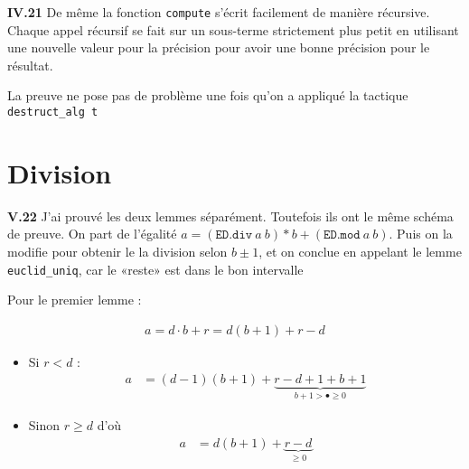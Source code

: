 \documentclass[9pt,a4paper,twocolumn]{article}
\theoremstyle{definition}
\renewcommand{\geq}{\geqslant}
\newenvironment{code}[1][ocaml]{%
\newgeometry{textwidth = 0.8\textwidth}
\VerbatimEnvironment\begin{verbatim}%
}{%
\end{verbatim}
\restoregeometry
}
\begin{document}

\textbf{IV.21}
De même la fonction \texttt{compute} s'écrit facilement de manière récursive.
Chaque appel récursif se fait sur un sous-terme strictement plus petit
en utilisant une nouvelle valeur pour la précision pour avoir une bonne
précision pour le résultat.

La preuve ne pose pas de problème une fois qu'on a appliqué la tactique
\texttt{destruct\_alg t}



\section{Division}

\textbf{V.22}
J'ai prouvé les deux lemmes séparément. Toutefois ils ont le même schéma de
preuve.
On part de l'égalité $a = (\texttt{ED.div}\ a\ b)*b+(\texttt{ED.mod}\ a\ b)$.
Puis on la modifie pour obtenir le la division selon $b\pm 1$, et on conclue en
appelant le lemme \texttt{euclid\_uniq}, car le «reste» est dans le bon
intervalle

Pour le premier lemme :

\begin{align*}
   a = d\cdot b+r = d(b+1) +r-d
\end{align*}

\begin{itemize}
   \item Si $r < d$ :
\begin{align*}
a   &= (d-1)(b+1) +
   \underbrace{r-d+1+b+1}_{b+1 > \bullet\geq 0}
\end{align*}
   \item Sinon $r \geq d$ d'où
\begin{align*}
a
   &= d(b+1) +
   \underbrace{r-d}_{\geq 0} \\
\end{align*}
\end{itemize}
\end{document}

